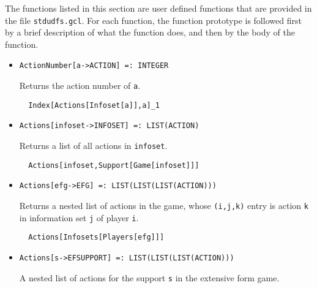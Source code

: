 The functions listed in this section are user defined functions that
are provided in the file \verb+stdudfs.gcl+.  For each function, the
function prototype is followed first by a brief description of what
the function does, and then by the body of the function.  

\begin{itemize}


\item{}
\protect \large \begin{verbatim}
ActionNumber[a->ACTION] =: INTEGER 
\end{verbatim}\normalsize

\bd 
Returns the action number of \verb+a+.
\begin{verbatim}
  Index[Actions[Infoset[a]],a]_1
\end{verbatim} 
\ed

\item{}
\protect \large \begin{verbatim}
Actions[infoset->INFOSET] =: LIST(ACTION) 
\end{verbatim}\normalsize

\bd 
Returns a list of all actions in \verb+infoset+.

\begin{verbatim}
  Actions[infoset,Support[Game[infoset]]]
\end{verbatim} 
\ed

\item{}
\protect \large \begin{verbatim}
Actions[efg->EFG] =: LIST(LIST(LIST(ACTION))) 
\end{verbatim}\normalsize

\bd 
Returns a nested list of actions in the game, whose  \verb+(i,j,k)+
entry is action \verb+k+ in information set \verb+j+ of player \verb+i+.

\begin{verbatim}
  Actions[Infosets[Players[efg]]]
\end{verbatim} 
\ed

\item{}
\protect \large \begin{verbatim}
Actions[s->EFSUPPORT] =: LIST(LIST(LIST(ACTION))) 
\end{verbatim}\normalsize

\bd 

A nested list of actions for the support \verb+s+ in the extensive
form game.


\end{itemize}
